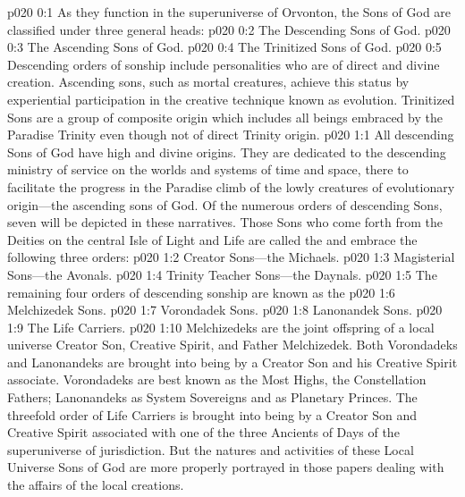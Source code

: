 \author{Perfector of Wisdom}
\vs p020 0:1 As they function in the superuniverse of Orvonton, the Sons of God are classified under three general heads:
\pc \vs p020 0:2 \bibnobreakspace The Descending Sons of God.
\vs p020 0:3 \bibnobreakspace The Ascending Sons of God.
\vs p020 0:4 \bibnobreakspace The Trinitized Sons of God.
\pc \vs p020 0:5 Descending orders of sonship include personalities who are of direct and divine creation. Ascending sons, such as mortal creatures, achieve this status by experiential participation in the creative technique known as evolution. Trinitized Sons are a group of composite origin which includes all beings embraced by the Paradise Trinity even though not of direct Trinity origin.\plusone
{}
\vs p020 1:1 All descending Sons of God have high and divine origins. They are dedicated to the descending ministry of service on the worlds and systems of time and space, there to facilitate the progress in the Paradise climb of the lowly creatures of evolutionary origin---the ascending sons of God. Of the numerous orders of descending Sons, seven will be depicted in these narratives. Those Sons who come forth from the Deities on the central Isle of Light and Life are called the  and embrace the following three orders:
\pc \vs p020 1:2 \bibnobreakspace Creator Sons---the Michaels.
\vs p020 1:3 \bibnobreakspace Magisterial Sons---the Avonals.
\vs p020 1:4 \bibnobreakspace Trinity Teacher Sons---the Daynals.
\pc \vs p020 1:5 The remaining four orders of descending sonship are known as the 
\vs p020 1:6 \bibnobreakspace Melchizedek Sons.
\vs p020 1:7 \bibnobreakspace Vorondadek Sons.
\vs p020 1:8 \bibnobreakspace Lanonandek Sons.
\vs p020 1:9 \bibnobreakspace The Life Carriers.
\pc \vs p020 1:10 Melchizedeks are the joint offspring of a local universe Creator Son, Creative Spirit, and Father Melchizedek. Both Vorondadeks and Lanonandeks are brought into being by a Creator Son and his Creative Spirit associate. Vorondadeks are best known as the Most Highs, the Constellation Fathers; Lanonandeks as System Sovereigns and as Planetary Princes. The threefold order of Life Carriers is brought into being by a Creator Son and Creative Spirit associated with one of the three Ancients of Days of the superuniverse of jurisdiction. But the natures and activities of these Local Universe Sons of God are more properly portrayed in those papers dealing with the affairs of the local creations.
